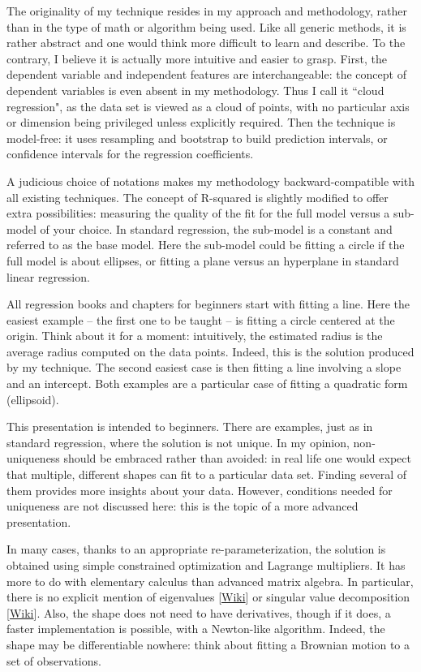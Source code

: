 \documentclass[oneside,10pt]{book}
\begin{document}
The originality of my technique resides in my approach and methodology, rather than in the type of math or algorithm being used. Like all generic methods, it is rather abstract and  one would think more difficult to learn and describe. To the contrary, I believe it is
 actually more intuitive and easier to grasp. First,
 the dependent variable and independent features are interchangeable: the concept of dependent variables is even absent in my methodology. Thus I call it ``cloud regression", as the data set is viewed as a cloud of points, with no particular axis or dimension being privileged unless explicitly required.
 Then the technique is model-free: it uses resampling and bootstrap to build prediction intervals, or confidence intervals for the
 regression coefficients.

A judicious choice of notations makes my methodology backward-compatible with all existing techniques. The concept of \textcolor{index}{R-squared} is slightly modified
 to offer extra possibilities: measuring the quality of the fit for the full model versus a sub-model of your choice.
 In standard regression, the sub-model is a constant and referred to as the base model. Here the sub-model could be fitting a circle if the full model
 is about ellipses, or fitting a plane versus an hyperplane in standard linear regression.

All regression books and chapters for beginners start with fitting a line. Here the easiest example -- the first one to be taught -- is fitting a circle centered at the origin. Think about it for a moment: intuitively, the estimated radius is the average radius computed on the data points. Indeed, this is the solution
 produced by my technique. The second easiest case is then fitting a line involving a slope and an intercept. Both examples are a particular case of fitting a quadratic form (ellipsoid).

This presentation is intended to beginners. There are examples, just as in standard regression, where the solution is not unique. In my opinion, non-uniqueness should be embraced rather than avoided: in real life one would expect that multiple, different shapes can fit to a particular data set. Finding several of them provides more insights about your data. However, conditions needed for uniqueness are not discussed here: this is the topic of a more advanced presentation.

In many cases, thanks to an appropriate re-parameterization, the solution is obtained using simple constrained optimization and Lagrange multipliers. It has more to do with elementary calculus than advanced matrix algebra. In particular,
there is no explicit mention of \textcolor{index}{eigenvalues}
[\href{https://en.wikipedia.org/wiki/Eigenvalues_and_eigenvectors}{Wiki}] or
 \textcolor{index}{singular value decomposition} [\href{https://en.wikipedia.org/wiki/Singular_value_decomposition}{Wiki}]. Also, the shape does not need to have derivatives, though if it does, a faster implementation is possible, with a Newton-like algorithm. Indeed, the shape may be differentiable nowhere: think about fitting a Brownian motion to a set of observations.
\end{document}
